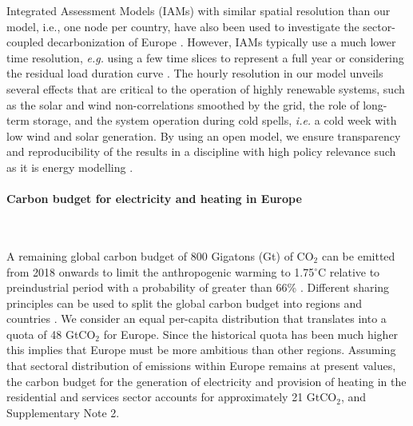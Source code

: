 \documentclass[5p]{elsarticle} %
\begin{document}
Integrated Assessment Models (IAMs) with similar spatial resolution than our model, i.e., one node per country, have also been used to investigate the sector-coupled decarbonization of Europe \cite{in-depth_2018, JRC-EU-TIMES, Creutzig_2017}. However, IAMs typically use a much lower time resolution, \textit{e.g.} using a few time slices to represent a full year \cite{JRC-EU-TIMES, Loffler_2019, Poncelet_2016, McGlade_2015, Babrowski_2014} or considering the residual load duration curve \cite{Creutzig_2017, Ueckerdt_2017}. The hourly resolution in our model unveils several effects that are critical to the operation of highly renewable systems, such as the solar and wind non-correlations smoothed by the grid, the role of long-term storage, and the system operation during cold spells, \textsl{i.e.} a cold week with low wind and solar generation. By using an open model, we ensure transparency and reproducibility of the results in a  discipline with high policy relevance such as it is energy modelling \cite{Pfenninger_2017, Pfenninger_2018}. 

\paragraph{\textbf{Carbon budget for electricity and heating in Europe}} \

A remaining global carbon budget of 800 Gigatons (Gt) of CO$_2$ can be emitted from 2018 onwards to limit the anthropogenic warming to 1.75$^{\circ}$C relative to preindustrial period with a probability of greater than 66\% \cite{IPCC_1.5}. Different sharing principles can be used to split the global carbon budget into regions and countries \cite{Raupach_2014}. We consider an equal per-capita distribution that translates into a quota of 48 GtCO$_2$ for Europe. Since the historical quota has been much higher this implies that Europe must be more ambitious than other regions. Assuming that sectoral distribution of emissions within Europe remains at present values, the carbon budget for the generation of electricity and provision of heating in the residential and services sector accounts for approximately 21 GtCO$_2$, \cite{UNFCCC_inventory} and Supplementary Note 2. %
\end{document}
